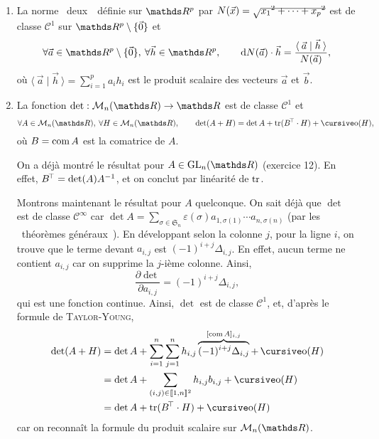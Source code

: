 \begin{exm}
	\begin{enumerate}
		\item La norme \guillemotleft~deux~\guillemotright\ définie sur $\R^p$ par $N(\vec{x}) = \sqrt{\smash{{x_1}^2 + \cdots + {x_p}^2}}$ est de classe $\mathcal{C}^1$ sur $\R^p \setminus \{\vec{0}\}$ et \[
				\forall \vec{a} \in \R^p \setminus \{\vec{0}\},\:\forall \vec{h} \in \R^p,\quad\quad \mathrm{d}N(\vec{a}) \cdot \vec{h} = \frac{\langle\:\vec{a} \mid \vec{h}\:\rangle}{N(\vec{a})}
			,\] où $\langle\:\vec{a} \mid \vec{h}\:\rangle = \sum_{i=1}^p a_ih_i$ est le produit scalaire des vecteurs $\vec{a}$ et $\vec{b}$.
		\item La fonction $\det : \mathcal{M}_n(\R) \to \R$ est de classe $\mathcal{C}^1$ et \[
				\forall A \in \mathcal{M}_n(\R),\:\forall H \in \mathcal{M}_n(\R),\quad\quad \det(A + H) = \det A + \tr(B^\T\cdot H) + \po(H)
			,\]où $B = \operatorname{com} A$ est la comatrice de $A$.

			On a déjà montré le résultat pour $A \in \mathrm{GL}_n(\R)$ (exercice 12). En effet, $B^{\!\!\,\top} = \operatorname{det}(A) A^{-1}$, et on conclut par linéarité de $\operatorname{tr}$.

			Montrons maintenant le résultat pour $A$ quelconque.
			On sait déjà que $\det$ est de classe $\mathcal{C}^\infty$ car $\det A = \sum_{\sigma \in \mathfrak{S}_n} \varepsilon(\sigma) a_{1,\sigma(1)} \cdots a_{n,\sigma(n)}$ (par les \guillemotleft~théorèmes généraux~\guillemotright).
			En développant selon la colonne $j$, pour la ligne $i$, on trouve que le terme devant $a_{i,j}$ est $(-1)^{i+j} \Delta_{i,j}$. En effet, aucun terme ne contient $a_{i,j}$ car on supprime la $j$-ième colonne. Ainsi, \[
				\frac{\partial \det}{\partial a_{i,j}} = (-1)^{i+j} \Delta_{i,j}
			,\] qui est une fonction continue. Ainsi, $\det$ est de classe $\mathcal{C}^1$, et, d'après le formule de \textsc{Taylor-Young},
			\begin{align*}
				\det(A + H) &= \det A + \sum_{i=1}^n \sum_{j=1}^n h_{i,j} \overbrace{(-1)^{i+j} \Delta_{i,j}}^{[\com A]_{i,j}} + \po(H)\\
				&= \det A + \sum_{(i,j) \in \llbracket 1,n \rrbracket^2} h_{i,j} b_{i,j} + \po(H) \\
				&= \det A + \tr(B^\T\cdot H) + \po(H) \\
			\end{align*}
			car on reconnaît la formule du produit scalaire sur $\mathcal{M}_n(\R)$.
	\end{enumerate}
\end{exm}

